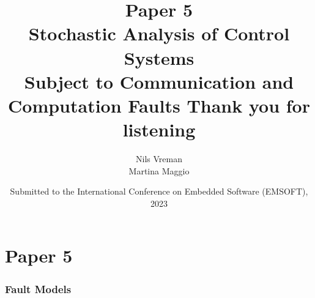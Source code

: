 \section{Paper 5}

\title[PhD Defence]{
    {\Huge Paper 5} \\
    \vspace{2mm}
    {\Large Stochastic Analysis of Control Systems}\\
    {\Large Subject to Communication and Computation Faults}
}
\author[Nils Vreman]{
    Nils Vreman \\
    \vspace{3mm}
    {\large Martina Maggio}
}
\date[EMSOFT 2023]{
    Submitted to the International Conference on Embedded Software (EMSOFT), 2023\\
}
\notitlelogo
{}


\begin{frame}
    \frametitle{Fault Models}
    \begin{figure}
        \centering
        \only<2>{}%
    \end{figure}
\end{frame}




\title[Preperatory Seminar]{%
    {\Huge Thank you for listening}
}
\author[Nils Vreman]{}
\date[]{}
\notitlelogo{}
